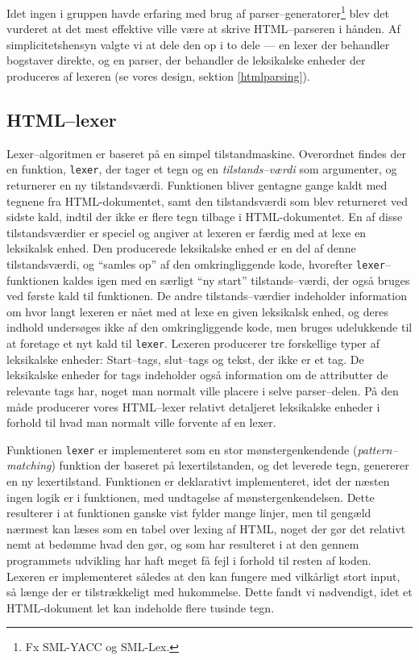 \documentclass[a4paper,oneside]{memoir}
\begin{document}
Idet ingen i gruppen havde erfaring med brug af
parser--generatorer\footnote{Fx SML-YACC og SML-Lex.}
blev det vurderet at det mest effektive ville være at skrive
HTML--parseren i hånden. Af simplicitetshensyn valgte vi at dele den
op i to dele --- en lexer der behandler bogstaver direkte, og en
parser, der behandler de leksikalske enheder der produceres af lexeren
(se vores design, sektion \ref{htmlparsing}).

\subsection{HTML--lexer}
\label{htmllexerimpl}
Lexer--algoritmen er baseret på en simpel tilstandmaskine. Overordnet
findes der en funktion, \texttt{lexer}, der tager et tegn og en
\textit{tilstands--værdi} som argumenter, og returnerer en ny
tilstandsværdi. Funktionen bliver gentagne gange kaldt med tegnene fra
HTML-dokumentet, samt den tilstandsværdi som blev returneret ved
sidste kald, indtil der ikke er flere tegn tilbage i
HTML-dokumentet. En af disse tilstandsværdier er speciel og angiver at
lexeren er færdig med at lexe en leksikalsk enhed. Den producerede
leksikalske enhed er en del af denne tilstandsværdi, og ``samles op''
af den omkringliggende kode, hvorefter \texttt{lexer}--funktionen
kaldes igen med en særligt ``ny start'' tilstands--værdi, der også
bruges ved første kald til funktionen. De andre tilstands--værdier
indeholder information om hvor langt lexeren er nået med at lexe en
given leksikalsk enhed, og deres indhold undersøges ikke af den
omkringliggende kode, men bruges udelukkende til at foretage et nyt
kald til \texttt{lexer}. Lexeren producerer tre forskellige typer af
leksikalske enheder: Start--tags, slut--tags og tekst, der ikke er et
tag. De leksikalske enheder for tags indeholder også information om de
attributter de relevante tags har, noget man normalt ville placere i
selve parser--delen. På den måde producerer vores HTML--lexer relativt
detaljeret leksikalske enheder i forhold til hvad man normalt ville
forvente af en lexer.

Funktionen \texttt{lexer} er implementeret som en stor
mønstergenkendende (\textit{pattern--matching}) funktion der baseret
på lexertilstanden, og det leverede tegn, genererer en ny
lexertilstand. Funktionen er deklarativt implementeret, idet der
næsten ingen logik er i funktionen, med undtagelse af
mønstergenkendelsen. Dette resulterer i at funktionen ganske vist
fylder mange linjer, men til gengæld nærmest kan læses som en tabel
over lexing af HTML, noget der gør det relativt nemt at bedømme hvad
den gør, og som har resulteret i at den gennem programmets udvikling
har haft meget få fejl i forhold til resten af koden. Lexeren er
implementeret således at den kan fungere med vilkårligt stort input,
så længe der er tilstrækkeligt med hukommelse. Dette fandt vi
nødvendigt, idet et HTML-dokument let kan indeholde flere tusinde
tegn. 
\end{document}
